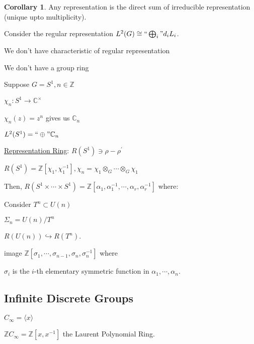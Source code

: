 \documentclass{article}
\theoremstyle{definition}
\newtheorem{corollary}[theorem]{Corollary}
\begin{document}
\begin{corollary}
    Any representation is the direct sum of irreducible representation (unique upto multiplicity).
\end{corollary}

Consider the regular representation \(L^2(G) \cong ``\bigoplus_{i}" d_i L_i\). 

We don't have characteristic of regular representation

We don't have a group ring

Suppose \(G = S^1, n\in \mathbb{Z}\) 

\(\chi_n : S^1 \to \mathbb{C} ^\times\) 

\(\chi_n(z) = z^n\) gives us \(\mathbb{C}_n\)

\(L^2(S^1) = ``\oplus" \mathbb{C}_n\) 

\underline{Representation Ring}: \(R(S^1) \ni \rho - \rho ^{\prime} \) 

\(R(S^1) = \mathbb{Z} [\chi_1, \chi_1 ^{-1}], \chi_n = \chi_1 \otimes _G \cdots \otimes _G \chi_1\) 

Then, \(R(S^1 \times \cdots \times S^1) = \mathbb{Z}[\alpha_1, \alpha_1 ^{-1}, \cdots , \alpha_r, \alpha_r ^{-1}]\) where:


\begin{center}


\end{center}

Consider \(T^n \subset U(n)\)

\(\Sigma_n = U(n) / T^n\) 

\(R(U(n))\hookrightarrow R(T^n)\).

image \(\mathbb{Z} [\sigma_1, \cdots , \sigma_{n-1}, \sigma_n, \sigma_n ^{-1}]\) where

\(\sigma_i\) is the \(i\)-th elementary symmetric function in \(\alpha_1, \cdots , \alpha_n\).

\subsection*{Infinite Discrete Groups}

\(C_\infty = \langle x \rangle \) 

\(\mathbb{Z} C_\infty = \mathbb{Z} [x, x ^{-1}]\) the Laurent Polynomial Ring.
\end{document}

